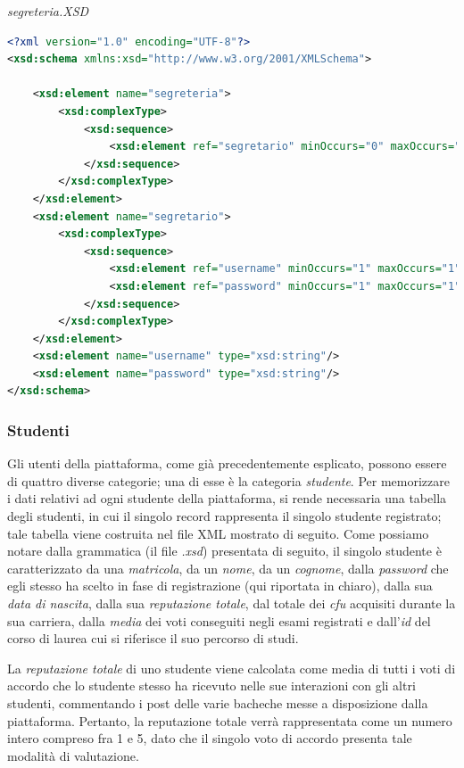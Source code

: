 \documentclass [a4paper,11pt]{book}
\begin{document}
\emph{segreteria.XSD}

\begin{lstlisting}[language=XML]
<?xml version="1.0" encoding="UTF-8"?>
<xsd:schema xmlns:xsd="http://www.w3.org/2001/XMLSchema">

    <xsd:element name="segreteria">
        <xsd:complexType>
            <xsd:sequence>
                <xsd:element ref="segretario" minOccurs="0" maxOccurs="unbounded" />
            </xsd:sequence>
        </xsd:complexType>
    </xsd:element>
    <xsd:element name="segretario">
        <xsd:complexType>
            <xsd:sequence>
                <xsd:element ref="username" minOccurs="1" maxOccurs="1"/>
                <xsd:element ref="password" minOccurs="1" maxOccurs="1"/>
            </xsd:sequence>
        </xsd:complexType>
    </xsd:element>
    <xsd:element name="username" type="xsd:string"/>
    <xsd:element name="password" type="xsd:string"/>
</xsd:schema>
\end{lstlisting}

\medskip

\subsubsection{Studenti}

Gli utenti della piattaforma, come già precedentemente esplicato, possono essere di quattro diverse categorie; una di esse è la categoria \emph{studente}. Per memorizzare i dati relativi ad ogni studente della piattaforma, si rende necessaria una tabella degli studenti, in cui il singolo record rappresenta il singolo studente registrato; tale tabella viene costruita nel file XML mostrato di seguito. Come possiamo notare dalla grammatica (il file \emph{.xsd}) presentata di seguito, il singolo studente è caratterizzato da una \emph{matricola}, da un \emph{nome}, da un \emph{cognome}, dalla \emph{password} che egli stesso ha scelto in fase di registrazione (qui riportata in chiaro), dalla sua \emph{data di nascita}, dalla sua \emph{reputazione totale}, dal totale dei \emph{cfu} acquisiti durante la sua carriera, dalla \emph{media} dei voti conseguiti negli esami registrati e dall'\emph{id} del corso di laurea cui si riferisce il suo percorso di studi.

La \emph{reputazione totale} di uno studente viene calcolata come media di tutti i voti di accordo che lo studente stesso ha ricevuto nelle sue interazioni con gli altri studenti, commentando i post delle varie bacheche messe a disposizione dalla piattaforma. Pertanto, la reputazione totale verrà rappresentata come un numero intero compreso fra 1 e 5, dato che il singolo voto di accordo presenta tale modalità di valutazione.
\end{document}
